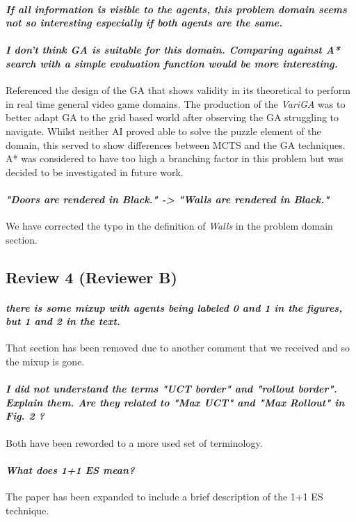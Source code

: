 \documentclass{article}
\begin{document}
\paragraph*{\textit{If all information is visible to the agents,
this problem domain seems not so interesting especially if
both agents are the same.}}
\paragraph*{\textit{I don't think GA is suitable for this domain.
Comparing against A* search with a simple evaluation function would be more interesting.}}
Referenced the design of the GA that shows validity in its theoretical to perform in real time general video game domains. The production of the \emph{VariGA} was to better adapt GA to the grid based world after observing the GA struggling to navigate. Whilst neither AI proved able to solve the puzzle element of the domain, this served to show differences between MCTS and the GA techniques. A* was considered to have too high a branching factor in this problem but was decided to be investigated in future work.

\paragraph*{\textit{"Doors are rendered in Black." -> "Walls are rendered in Black."}}
We have corrected the typo in the definition of \emph{Walls} in the problem domain section.
\subsection{Review 4 (Reviewer B)}
\paragraph*{\textit{there is some mixup with agents being labeled 0 and 1 in the figures, but 1 and 2 in the text.}}
That section has been removed due to another comment that we received and so the mixup is gone. 

\paragraph*{\textit{I did not understand the terms "UCT border" and "rollout border". Explain them. Are they related to "Max UCT" and "Max Rollout" in Fig. 2 ?}}
Both have been reworded to a more used set of terminology.
\paragraph*{\textit{What does 1+1 ES mean?}}
The paper has been expanded to include a brief description of the 1+1 ES technique.
\end{document}
